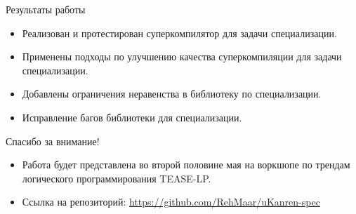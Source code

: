 \documentclass[xcolor=table]{beamer}
\begin{document}
%
\begin{frame}{Результаты работы}
  \begin{itemize}
  \item Реализован и протестирован суперкомпилятор для задачи специализации.
  \item Применены подходы по улучшению качества суперкомпиляции для задачи специализации.
  \item Добавлены ограничения неравенства в библиотеку по специализации.
  \item Исправление багов библиотеки для специализации.
  \end{itemize}
\end{frame}

\begin{frame}{Спасибо за внимание!}
\begin{itemize}
\item Работа будет представлена во второй половине мая на воркшопе по трендам логического программирования TEASE-LP.
\item Ссылка на репозиторий: \url{https://github.com/RehMaar/uKanren-spec}
\end{itemize}
\end{frame}


\end{document}
